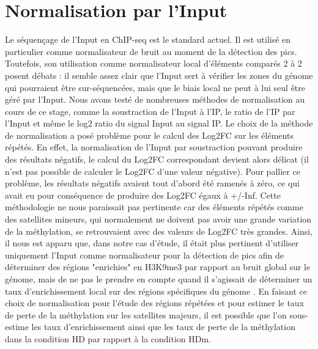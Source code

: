\documentclass[a4paper,12pt,times]{report}
\begin{document}
   \section {Normalisation par l'Input}
  Le séquençage de l'Input en ChIP-seq est le standard actuel. Il est utilisé en particulier comme normalisateur de bruit au moment de la détection des pics. Toutefois, son utilisation comme normalisateur local d'éléments comparés 2 à 2 posent débats : il semble assez clair que l'Input sert à vérifier les zones du génome qui pourraient être sur-séquencées, mais que le biais local ne peut à lui seul être géré par l'Input.
 \newline Nous avons testé de nombreuses méthodes de normalisation au cours de ce stage, comme la soustraction de l'Input à l'IP, le ratio de l'IP par l'Input et même le log2 ratio du signal Input au signal IP. 
 Le choix de la méthode de normalisation a posé problème pour le calcul des Log2FC sur les éléments répétés. En effet,  la normalisation de l'Input par soustraction pouvant produire des résultats négatifs, le calcul du Log2FC correspondant devient alors délicat (il n'est pas possible de calculer le Log2FC d'une valeur négative). Pour pallier ce problème, les résultats négatifs avaient tout d'abord été ramenés à zéro, ce qui avait eu pour conséquence de produire des Log2FC égaux à +/-Inf. Cette méthodologie ne nous paraissait pas pertinente car des éléments répétés comme des satellites mineurs, qui normalement ne doivent pas avoir une grande variation de la méthylation, se retrouvaient avec des valeurs de Log2FC très grandes.
  \newline
  Ainsi, il nous est apparu que, dans notre cas d'étude, il était plus pertinent d'utiliser uniquement l'Input comme normalisateur pour la détection de pics afin de déterminer des régions "enrichies" en H3K9me3 par rapport au bruit global sur le génome, mais de ne pas le prendre en compte quand il s'agissait de déterminer un taux d'enrichissement local sur des régions spécifiques du génome .
  \newline
   En faisant ce choix de normalisation pour l'étude des régions répétées et pour estimer le taux de perte de la méthylation  sur les satellites majeurs, il est possible que l'on sous-estime les taux d'enrichissement  ainsi que les taux de perte de la méthylation dans la condition HD par rapport à la condition HDm. 
  
\end{document}

